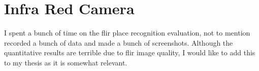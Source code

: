 \chapter{Infra Red Camera}
\label{chapter:flir}

I spent a bunch of time on the flir place recognition evaluation, not to mention recorded a
bunch of data and made a bunch of screenshots.  Although the quantitative results are terrible due
to flir image quality, I would like to add this to my thesis as it is somewhat relevant.


